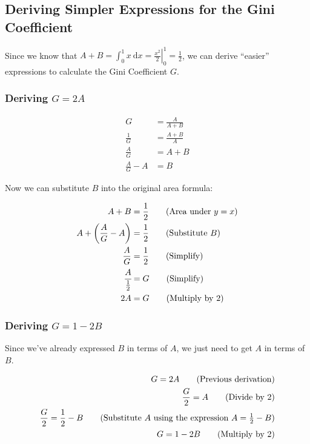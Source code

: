 \documentclass[
  letterpaper,
  DIV=11,
  numbers=noendperiod]{scrartcl}
\begin{document}
\subsection{Deriving Simpler Expressions for the Gini
Coefficient}\label{deriving-simpler-expressions-for-the-gini-coefficient}

Since we know that
\(A+B = \int_{0}^{1} x \ \mathrm{d}x = \left.\frac{x^2}{2}\right\vert_{0}^{1} = \frac{1}{2}\),
we can derive ``easier'' expressions to calculate the Gini Coefficient
\(G\).

\subsubsection{\texorpdfstring{Deriving
\(G=2A\)}{Deriving G=2A}}\label{deriving-g2a}

\begin{align}
G &= \frac{A}{A+B}\tag{Initial Gini Coefficient formula} \\
\frac{1}{G} &= \frac{A+B}{A}\tag{Reciprocate} \\
\frac{A}{G} &= A+B\tag{Multiply by $A$} \\
\frac{A}{G}-A &= B\tag{Subtract $A$}
\end{align}

\newpage{}

Now we can substitute \(B\) into the original area formula:

\begin{align}
A + B &= \frac{1}{2}\tag{Area under $y=x$} \\
A+\left(\frac{A}{G}-A\right) &= \frac{1}{2}\tag{Substitute $B$} \\
\frac{A}{G} &= \frac{1}{2}\tag{Simplify} \\
\cfrac{A}{\frac{1}{2}} &= G\tag{Simplify} \\
2A &= G\tag{Multiply by 2}
\end{align}

\subsubsection{\texorpdfstring{Deriving
\(G=1-2B\)}{Deriving G=1-2B}}\label{deriving-g1-2b}

Since we've already expressed \(B\) in terms of \(A\), we just need to
get \(A\) in terms of \(B\).

\begin{align}
G = 2A \tag{Previous derivation} \\
\frac{G}{2} = A \tag{Divide by 2} \\
\frac{G}{2} = \frac{1}{2}-B\tag{Substitute $A$ using the expression $A=\frac{1}{2}-B$} \\
G = 1-2B\tag{Multiply by 2}
\end{align}
\end{document}
